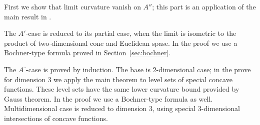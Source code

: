 First we show that limit curvature vanish on $A''$; 
this part is an application of the main result in \cite{petrunin-SC}.

The $A'$-case is reduced to its partial case, when the limit is isometric to the product of two-dimensional cone and Euclidean spase.
In the proof we use a Bochner-type formula proved in Section~\ref{sec:bochner}.

The $A^\circ$-case is proved by induction.
The base is $2$-dimensional case; in the prove for dimension $3$ we apply the main theorem to level sets of special concave functions.
These level sets have the same lower curvature bound provided by Gauss theorem. 
In the proof we use a Bochner-type formula as well.
Multidimensional case is reduced to dimension $3$, using special $3$-dimensional intersections of concave functions.
